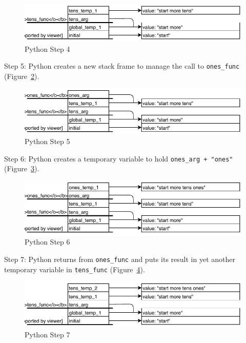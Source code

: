 \begin{figure}[h]
  \includegraphics{figures/nse/python-step-04.pdf}
  \caption{Python Step 4}
  \label{fig:py-step-4}
\end{figure}

Step 5: Python creates a new stack frame to manage the call to \texttt{ones\_func}
(Figure~\ref{fig:py-step-5}).

\begin{figure}[h]
  \includegraphics{figures/nse/python-step-05.pdf}
  \caption{Python Step 5}
  \label{fig:py-step-5}
\end{figure}

Step 6: Python creates a temporary variable to hold \texttt{ones\_arg + "ones"}
(Figure~\ref{fig:py-step-6}).

\begin{figure}[h]
  \includegraphics{figures/nse/python-step-06.pdf}
  \caption{Python Step 6}
  \label{fig:py-step-6}
\end{figure}

Step 7: Python returns from \texttt{ones\_func}
and puts its result in yet another temporary variable in \texttt{tens\_func}
(Figure~\ref{fig:py-step-7}).

\begin{figure}[h]
  \includegraphics{figures/nse/python-step-07.pdf}
  \caption{Python Step 7}
  \label{fig:py-step-7}
\end{figure}

